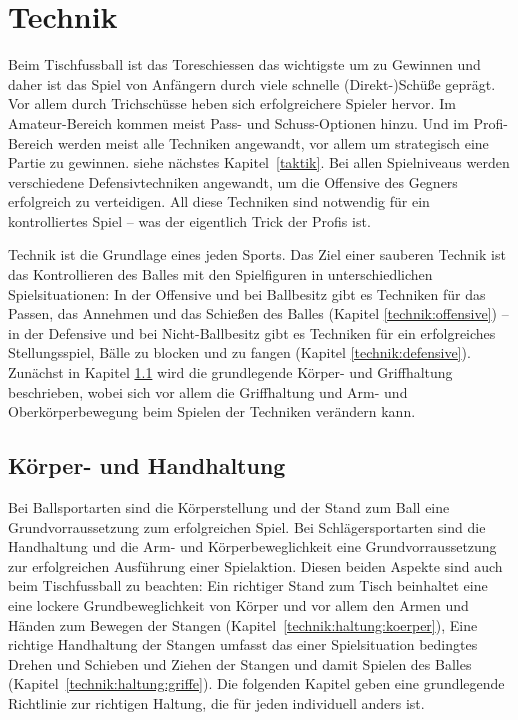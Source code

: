 \chapter{Technik}
\label{technik}

Beim Tischfussball ist das Toreschiessen das wichtigste um zu Gewinnen und daher ist das Spiel von Anfängern durch viele schnelle (Direkt-)Schüße geprägt.
Vor allem durch Trichschüsse heben sich erfolgreichere Spieler hervor.
Im Amateur-Bereich kommen meist Pass- und Schuss-Optionen hinzu.
Und im Profi-Bereich werden meist alle Techniken angewandt, vor allem um strategisch eine Partie zu gewinnen. siehe nächstes Kapitel~\ref{taktik}. 
Bei allen Spielniveaus werden verschiedene Defensivtechniken angewandt, um die Offensive des Gegners erfolgreich zu verteidigen.
All diese Techniken sind notwendig für ein kontrolliertes Spiel -- was der eigentlich Trick der Profis ist.

Technik ist die Grundlage eines jeden Sports. 
Das Ziel einer sauberen Technik ist das Kontrollieren des Balles mit den Spielfiguren in unterschiedlichen Spielsituationen:
In der Offensive und bei Ballbesitz gibt es Techniken für das Passen, das Annehmen und das Schießen des Balles (Kapitel \ref{technik:offensive}) -- in der Defensive und bei Nicht-Ballbesitz gibt es Techniken für ein erfolgreiches Stellungsspiel, Bälle zu blocken und zu fangen (Kapitel \ref{technik:defensive}). 
Zunächst in Kapitel \ref{technik:haltung} wird die grundlegende Körper- und Griffhaltung beschrieben, wobei sich vor allem die Griffhaltung und Arm- und Oberkörperbewegung beim Spielen der Techniken verändern kann. 


\section{Körper- und Handhaltung}
\label{technik:haltung}

Bei Ballsportarten sind die Körperstellung und der Stand zum Ball eine Grundvorraussetzung zum erfolgreichen Spiel.
Bei Schlägersportarten sind die Handhaltung und die Arm- und Körperbeweglichkeit eine Grundvorraussetzung zur erfolgreichen Ausführung einer Spielaktion.
Diesen beiden Aspekte sind auch beim Tischfussball zu beachten:
Ein richtiger Stand zum Tisch beinhaltet eine eine lockere Grundbeweglichkeit von Körper und vor allem den Armen und Händen zum Bewegen der Stangen (Kapitel~\ref{technik:haltung:koerper}),
Eine richtige Handhaltung der Stangen umfasst das einer Spielsituation bedingtes Drehen und Schieben und Ziehen der Stangen und damit Spielen des Balles (Kapitel~\ref{technik:haltung:griffe}).
Die folgenden Kapitel geben eine grundlegende Richtlinie zur richtigen Haltung, die für jeden individuell anders ist. 

